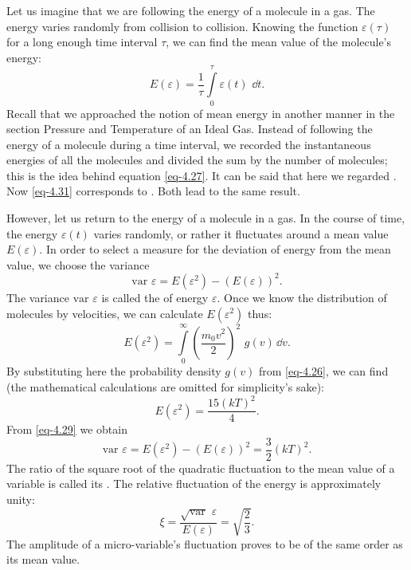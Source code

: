 Let us imagine that we are following the energy of a molecule in
a gas. The energy varies randomly from collision to collision. Knowing
the function $\varepsilon (\tau)$ for a long enough time interval $\tau$, we can find the mean value of the molecule's energy:
\begin{equation}%
E(\varepsilon) = \frac{1}{\tau} \int\limits_{0}^{\tau} \varepsilon (t)\,\, \dd t.
\label{eq-4.31}
\end{equation}
Recall that we approached the notion of mean energy in another manner in the section Pressure and Temperature of an Ideal Gas. Instead of following the energy of a molecule during a time interval, we recorded the instantaneous energies of all the molecules and divided the sum by the number of molecules; this is the idea behind equation \eqref{eq-4.27}. It can be said that here we regarded . Now \eqref{eq-4.31} corresponds to . Both lead to the same result.

However, let us return to the energy of a molecule in a gas. In the course of time, the energy $\varepsilon (t)$ varies randomly, or rather it fluctuates around a mean value $E(\varepsilon)$. In order to select a measure for the deviation of energy from the mean value, we choose the variance
\begin{equation}%
\textrm{var} \,\, \varepsilon = E(\varepsilon^{2})  - ( E(\varepsilon))^{2}.
\label{eq-4.32}
\end{equation}
The variance $\textrm{var} \,\, \varepsilon$ is called the  of energy $\varepsilon$. Once we know the distribution of molecules by velocities, we can calculate $E(\varepsilon^{2}) $ thus:
\begin{equation}%
 E(\varepsilon^{2})  = \int\limits_{0}^{\infty} \left( \frac{m_{0} v^{2}}{2} \right)^{2} \,\, g(v) \, \dd v.
\label{eq-4.33}
\end{equation}
By substituting here the probability density $g (v)$ from \eqref{eq-4.26}, we can find (the mathematical calculations are omitted for simplicity's sake):
\begin{equation}%
E(\varepsilon^{2}) = \frac{15(kT)^{2}}{4}.
\label{eq-4.34}
\end{equation}
From \eqref{eq-4.29} we obtain
\begin{equation}%
\textrm{var} \,\, \varepsilon = E(\varepsilon^{2})  - ( E(\varepsilon))^{2} = \frac{3}{2} (kT)^{2}.
\label{eq-4.35}
\end{equation}
The ratio of the square root of the quadratic fluctuation to the mean value of a variable is called its . The relative fluctuation of the energy is approximately unity:
\begin{equation}%
\xi = \frac{\sqrt{\textrm{var}} \,\, \varepsilon }{ E(\varepsilon)} = \sqrt{\frac{2}{3}}.
\label{eq-4.36}
\end{equation}
The amplitude of a micro-variable's fluctuation proves to be of the same order as its mean value.

